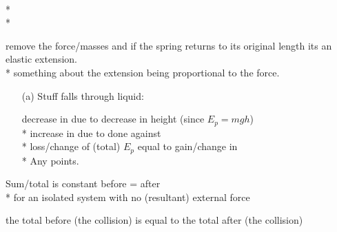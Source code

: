 \begin{question}%
  \\*
  \OR\\*

  remove the force/masses and if the spring returns to its original length its an elastic extension.~\hfill{}\\*
  \NOT something about the extension being proportional to the force.
\end{question}

\begin{question}%

  \begin{itemize}
    \item [(a)] Stuff falls through liquid:

      decrease in  due to decrease in height (since $E_p = mgh$)\\*
      increase in  due to  done against \\*
      loss/change of (total) $E_p$ equal to gain/change in \\*
      Any  points.
  \end{itemize}
\end{question}

\begin{question}%

  Sum/total  is constant \OR before = after~\hfill{}\\*
  for an isolated system \OR with no (resultant) external force~\hfill{}
\end{question}

\begin{question}%

  the total  before (the collision) is equal to the total  after (the collision)~\hfill{}
\end{question}

